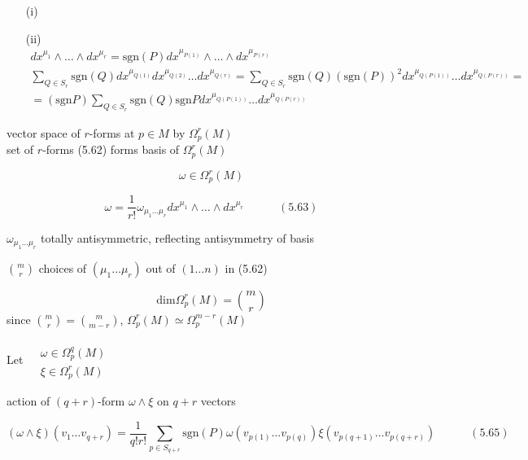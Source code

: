 \documentclass{book}
\begin{document}
\begin{enumerate}
  \item[(i)]
  \item[(ii)] \[
    \begin{gathered}
      dx^{\mu_1} \wedge \dots \wedge dx^{\mu_r} = \text{sgn}{ (P)} dx^{\mu_{P(1)} } \wedge \dots \wedge dx^{\mu_{ P(r)} } \\ 
      \sum_{ Q \in S_r} \text{sgn}{ (Q)} dx^{\mu_{Q(1) } } dx^{\mu_{Q(2) } } \ldots dx^{\mu_{Q(r)}}  = \sum_{Q \in S_r} \text{sgn}{ (Q) } ( \text{sgn}(P))^2 dx^{\mu_{Q(P(1)) }} \dots dx^{\mu_{Q(P(r)) } } = \\
       = ( \text{sgn}{ P } ) \sum_{Q \in  S_r } \text{sgn}{(Q)} \text{sgn}{ P } dx^{\mu_{Q(P(1)) }} \ldots dx^{ \mu_{Q(P(r)) } }
\end{gathered}
\]
\end{enumerate}


vector space of $r$-forms at $p\in M$ by $\Omega_p^r(M)$ \\
set of $r$-forms (5.62) forms basis of $\Omega_p^r(M)$

\[
\omega \in \Omega_p^r(M)
\]


\begin{equation}
  \omega = \frac{1}{r!} \omega_{\mu_1 \dots \mu_r} dx^{\mu_1} \wedge \dots \wedge dx^{\mu_r} \quad \quad \quad (5.63)
\end{equation}




$\omega_{\mu_1 \dots \mu_r}$ totally antisymmetric, reflecting antisymmetry of basis

$\binom{m}{r}$ choices of $(\mu_1 \dots \mu_r)$ out of $(1 \dots n)$ in (5.62)

\[
\text{dim}{ \Omega_p^r(M) } = \binom{m}{r}
\]
since $\binom{m}{r} = \binom{m}{m-r}$, $\Omega_p^r(M) \simeq \Omega_p^{m-r}(M)$

Let $\begin{aligned} & \quad \\ & \omega \in \Omega_p^q(M)  \\ & \xi \in \Omega_p^r(M) \end{aligned}$

action of $(q+r)$-form $\omega \wedge \xi $ on $q+r$ vectors 

\begin{equation}
  (\omega \wedge \xi )(v_1 \dots v_{q+r} ) = \frac{1}{q! r!} \sum_{ p \in S_{q+r}} \text{sgn}{(P)} \omega( v_{p(1)} \dots v_{p(q)} ) \xi(v_{p(q+1)} \dots v_{ p(q+r) } ) \quad \quad \quad (5.65)
\end{equation}
\end{document}
